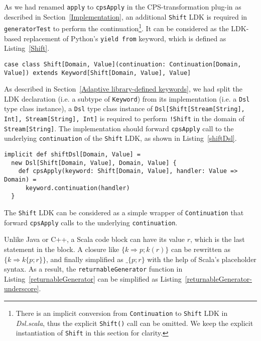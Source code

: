 As we had renamed \lstinline{apply} to \lstinline{cpsApply} in the CPS-transformation plug-in as described in Section~\ref{Implementation},  an additional \lstinline{Shift} LDK is required in \lstinline{generatorTest} to perform the continuation\footnote{There is an implicit conversion from \lstinline{Continuation} to \lstinline{Shift} LDK in \textit{Dsl.scala}, thus the explicit \lstinline{Shift()} call can be omitted. We keep the explicit instantiation of \lstinline{Shift} in this section for clarity.}. It can be considered as the LDK-based replacement of Python's \lstinline{yield from} keyword, which is defined as Listing~\ref{Shift}.

\begin{lstlisting}[caption={The definition of \lstinline{Shift} LDK},label={Shift}]
case class Shift[Domain, Value](continuation: Continuation[Domain, Value]) extends Keyword[Shift[Domain, Value], Value]
\end{lstlisting}

As described in Section~\ref{Adaptive library-defined keywords}, we had split the LDK declaration (i.e. a subtype of \lstinline{Keyword}) from its implementation (i.e. a \lstinline{Dsl} type class instance), a \lstinline{Dsl} type class instance of \lstinline{Dsl[Shift[Stream[String], Int], Stream[String], Int]} is required to perform \lstinline{!Shift} in the domain of \lstinline{Stream[String]}. The implementation should forward \lstinline{cpsApply} call to the underlying \lstinline{continuation} of the \lstinline{Shift} LDK, as shown in Listing~\ref{shiftDsl}.

\begin{lstlisting}[caption={The \lstinline{Dsl} instance of \lstinline{Shift} LDK, to forward \lstinline{cpsApply} to the underlying \lstinline{continuation}},label={shiftDsl}]
implicit def shiftDsl[Domain, Value] =
  new Dsl[Shift[Domain, Value], Domain, Value] {
    def cpsApply(keyword: Shift[Domain, Value], handler: Value => Domain) =
      keyword.continuation(handler)
  }
\end{lstlisting}

The \lstinline{Shift} LDK can be considered as a simple wrapper of \lstinline{Continuation} that forward \lstinline{cpsApply} calls to the underlying \lstinline{continuation}.

Unlike Java or C++, a Scala code block can have its value $r$, which is the last statement in the block. A closure like $\{ k \Rightarrow p; k(r) \}$ can be rewritten as $\{ k \Rightarrow k \{ p; r \} \}$, and finally simplified as $\_ \{ p; r \}$ with the help of Scala's placeholder syntax. As a result, the \lstinline{returnableGenerator} function in Listing~\ref{returnableGenerator} can be simplified as Listing~\ref{returnableGenerator-underscore}.

